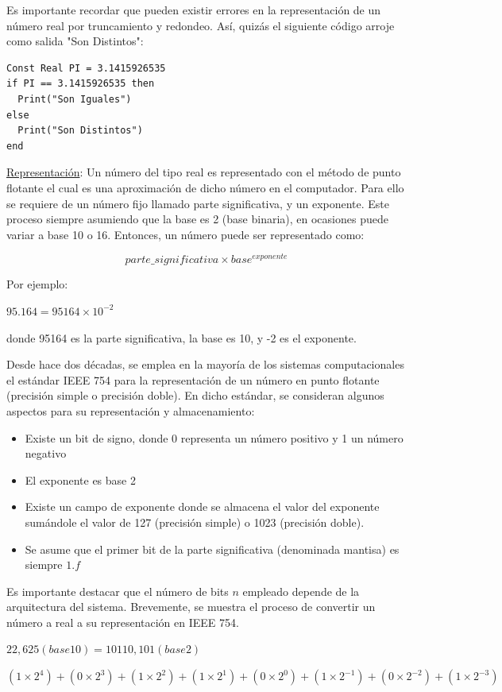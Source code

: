 Es importante recordar que pueden existir errores en la representación de un número real por truncamiento y redondeo. Así, quizás el siguiente código arroje como salida "Son Distintos":
\begin{lstlisting}[upquote=true, language=pseudo]
Const Real PI = 3.1415926535
if PI == 3.1415926535 then
  Print("Son Iguales")
else
  Print("Son Distintos")
end
\end{lstlisting}

\underline{Representación}: Un número del tipo real es representado con el método de punto flotante el cual es una aproximación de dicho número en el computador. Para ello se requiere de un número fijo llamado parte significativa, y un exponente. Este proceso siempre asumiendo que la base es 2 (base binaria), en ocasiones puede variar a base 10 o 16. Entonces, un número puede ser representado como:

$$parte\_significativa \times base^{exponente}$$

Por ejemplo:

$95.164 = 95164 \times 10^{-2}$

\noindent donde 95164 es la parte significativa, la base es 10, y -2 es el exponente.

Desde hace dos décadas, se emplea en la mayoría de los sistemas computacionales el estándar IEEE 754 para la representación de un número en punto flotante (precisión simple o precisión doble). En dicho estándar, se consideran algunos aspectos para su representación y almacenamiento:
\begin{itemize}
\item Existe un bit de signo, donde 0 representa un número positivo y 1 un número negativo
\item El exponente es base 2
\item Existe un campo de exponente donde se almacena el valor del exponente sumándole el valor de 127 (precisión simple) o 1023 (precisión doble).
\item Se asume que el primer bit de la parte significativa (denominada mantisa) es siempre $1.f$
\end{itemize}

Es importante destacar que el número de bits $n$ empleado depende de la arquitectura del sistema. Brevemente, se muestra el proceso de convertir un número a real a su representación en IEEE 754.

$22,625 (base 10) = 10110,101 (base 2)$

\begin{center}
$(1 \times 2^4) + (0 \times 2^3) + (1 \times 2^2) + (1 \times 2^1) + (0 \times 2^0) + (1 \times 2^{-1}) + (0 \times 2^{-2}) + (1 \times 2^{-3})$
\end{center}

